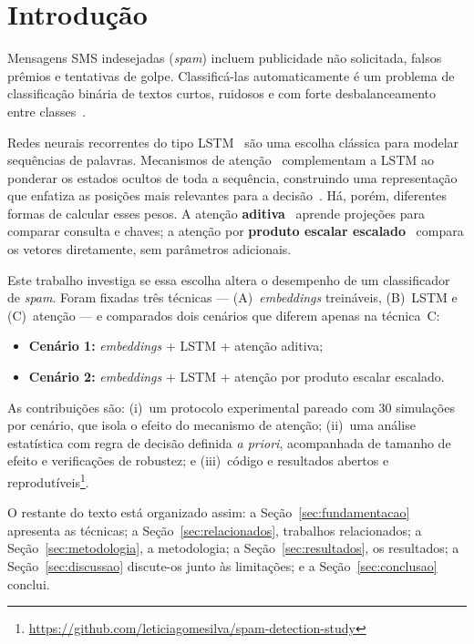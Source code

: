 \documentclass[conference]{IEEEtran}
\begin{document}
\section{Introdução}

Mensagens SMS indesejadas (\textit{spam}) incluem publicidade não solicitada, falsos prêmios e tentativas de golpe. Classificá-las automaticamente é um problema de classificação binária de textos curtos, ruidosos e com forte desbalanceamento entre classes~\cite{almeida2011}.

Redes neurais recorrentes do tipo LSTM~\cite{hochreiter1997} são uma escolha clássica para modelar sequências de palavras. Mecanismos de atenção~\cite{bahdanau2015,luong2015,vaswani2017} complementam a LSTM ao ponderar os estados ocultos de toda a sequência, construindo uma representação que enfatiza as posições mais relevantes para a decisão~\cite{yang2016}. Há, porém, diferentes formas de calcular esses pesos. A atenção \textbf{aditiva}~\cite{bahdanau2015} aprende projeções para comparar consulta e chaves; a atenção por \textbf{produto escalar escalado}~\cite{vaswani2017} compara os vetores diretamente, sem parâmetros adicionais.

Este trabalho investiga se essa escolha altera o desempenho de um classificador de \textit{spam}. Foram fixadas três técnicas --- (A)~\textit{embeddings} treináveis, (B)~LSTM e (C)~atenção --- e comparados dois cenários que diferem apenas na técnica~C:
\begin{itemize}
  \item \textbf{Cenário 1:} \textit{embeddings} + LSTM + atenção aditiva;
  \item \textbf{Cenário 2:} \textit{embeddings} + LSTM + atenção por produto escalar escalado.
\end{itemize}

As contribuições são: (i)~um protocolo experimental pareado com 30 simulações por cenário, que isola o efeito do mecanismo de atenção; (ii)~uma análise estatística com regra de decisão definida \textit{a priori}, acompanhada de tamanho de efeito e verificações de robustez; e (iii)~código e resultados abertos e reprodutíveis\footnote{\url{https://github.com/leticiagomesilva/spam-detection-study}}.

O restante do texto está organizado assim: a Seção~\ref{sec:fundamentacao} apresenta as técnicas; a Seção~\ref{sec:relacionados}, trabalhos relacionados; a Seção~\ref{sec:metodologia}, a metodologia; a Seção~\ref{sec:resultados}, os resultados; a Seção~\ref{sec:discussao} discute-os junto às limitações; e a Seção~\ref{sec:conclusao} conclui.
\end{document}
